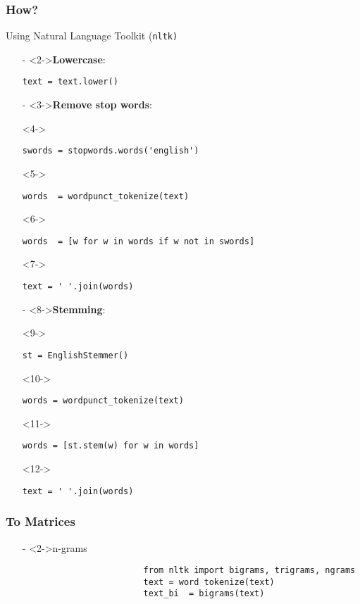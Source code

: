 \documentclass[compress, black]{beamer}
\begin{document}
\begin{frame}[fragile]
	\frametitle{How?}
	Using Natural Language Toolkit (\tt{nltk})
	\begin{itemize}
			\item[-]<2->\textbf{Lowercase}: 
 					 	\begin{verbatim}text = text.lower() \end{verbatim} 
 			\item[-]<3->\textbf{Remove stop words}:
	 			\item[]<4->\begin{verbatim}swords = stopwords.words('english') \end{verbatim}
	 			\item[]<5->\begin{verbatim}words  = wordpunct_tokenize(text) \end{verbatim}
	 			\item[]<6->\begin{verbatim}words  = [w for w in words if w not in swords] \end{verbatim}
	    		\item[]<7->\begin{verbatim}text = ' '.join(words) \end{verbatim}
 			\item[-]<8->\textbf{Stemming}: 
 				\item[]<9->\begin{verbatim}st = EnglishStemmer() \end{verbatim}
 				\item[]<10->\begin{verbatim}words = wordpunct_tokenize(text) \end{verbatim}
    			\item[]<11->\begin{verbatim}words = [st.stem(w) for w in words] \end{verbatim}
    			\item[]<12->\begin{verbatim}text = ' '.join(words) \end{verbatim}
		\end{itemize}
\end{frame}
\begin{frame}[fragile]
	\frametitle{To Matrices}
	\begin{itemize}
			\item[-]<2->n-grams
					\begin{verbatim}
						from nltk import bigrams, trigrams, ngrams
						text = word tokenize(text)
						text_bi  = bigrams(text)
					\end{verbatim}
	\end{itemize}
\end{frame}
\end{document}
